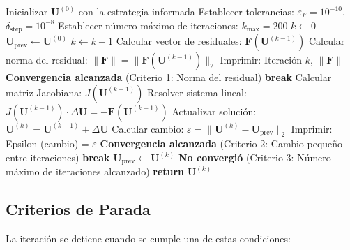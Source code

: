 \documentclass[11pt,letterpaper]{article}
\begin{document}
\begin{algorithm}[H]
\caption{Método de Newton-Raphson para el Sistema No Lineal}
\begin{algorithmic}[1]
\STATE Inicializar $\mathbf{U}^{(0)}$ con la estrategia informada
\STATE Establecer tolerancias: $\varepsilon_F = 10^{-10}$, $\delta_{\text{step}} = 10^{-8}$
\STATE Establecer número máximo de iteraciones: $k_{\max} = 200$
\STATE $k \gets 0$
\STATE $\mathbf{U}_{\text{prev}} \gets \mathbf{U}^{(0)}$
    \STATE $k \gets k + 1$
    \STATE Calcular vector de residuales: $\mathbf{F}(\mathbf{U}^{(k-1)})$
    \STATE Calcular norma del residual: $\|\mathbf{F}\| = \|\mathbf{F}(\mathbf{U}^{(k-1)})\|_2$
    \STATE Imprimir: Iteración $k$, $\|\mathbf{F}\|$
        \STATE \textbf{Convergencia alcanzada} (Criterio 1: Norma del residual)
        \STATE \textbf{break}
    \ENDIF
    \STATE Calcular matriz Jacobiana: $J(\mathbf{U}^{(k-1)})$
    \STATE Resolver sistema lineal: $J(\mathbf{U}^{(k-1)}) \cdot \Delta\mathbf{U} = -\mathbf{F}(\mathbf{U}^{(k-1)})$
    \STATE Actualizar solución: $\mathbf{U}^{(k)} = \mathbf{U}^{(k-1)} + \Delta\mathbf{U}$
    \STATE Calcular cambio: $\varepsilon = \|\mathbf{U}^{(k)} - \mathbf{U}_{\text{prev}}\|_2$
    \STATE Imprimir: Epsilon (cambio) = $\varepsilon$
        \STATE \textbf{Convergencia alcanzada} (Criterio 2: Cambio pequeño entre iteraciones)
        \STATE \textbf{break}
    \ENDIF
    \STATE $\mathbf{U}_{\text{prev}} \gets \mathbf{U}^{(k)}$
\ENDWHILE
{}
    \STATE \textbf{No convergió} (Criterio 3: Número máximo de iteraciones alcanzado)
\ENDIF
\STATE \textbf{return} $\mathbf{U}^{(k)}$
\end{algorithmic}
\end{algorithm}

\subsection{Criterios de Parada}

La iteración se detiene cuando se cumple una de estas condiciones:
\end{document}

